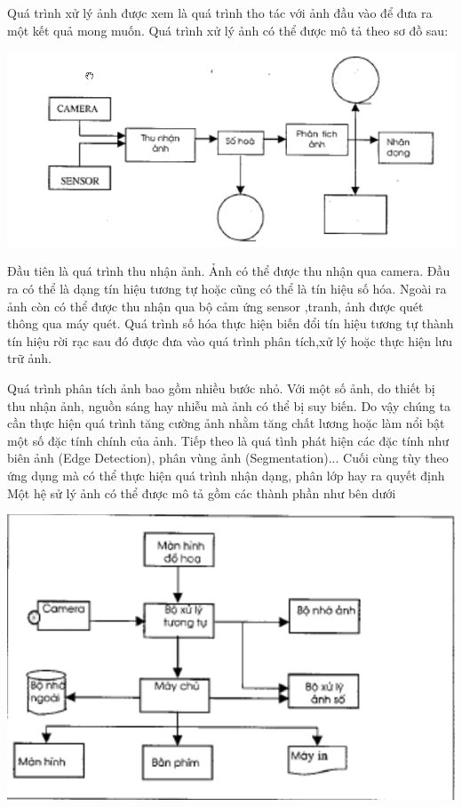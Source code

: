 \documentclass[12pt,oneside,a4]{report}
\begin{document}
Quá trình xử lý ảnh được xem là quá trình tho tác với ảnh đầu vào để đưa ra một kết quả mong muốn. Quá trình xử lý ảnh có thể được mô tả theo sơ đồ sau:
\begin{center}
\includegraphics[]{figure/htxulyanh.png}
\end{center}
Đầu tiên là quá trình thu nhận ảnh. Ảnh có thể được thu nhận qua camera. Đầu ra có thể là dạng tín hiệu tương tự hoặc cũng có thể là tín hiệu số hóa. Ngoài ra ảnh còn có thể được thu nhận qua bộ cảm ứng sensor ,tranh, ảnh được quét thông qua máy quét.
Quá trình số hóa thực hiện biến đổi tín hiệu tương tự thành tín hiệu rời rạc sau đó được đưa vào quá trình phân tích,xử lý hoặc thực hiện lưu trữ ảnh.

Quá trình phân tích ảnh bao gồm nhiều bước nhỏ. Với một số ảnh, do thiết bị thu nhận ảnh, nguồn sáng hay nhiễu mà ảnh có thể bị suy biến. Do vậy chúng ta cần thực hiện quá trình tăng cường ảnh nhằm tăng chất lương hoặc làm nổi bật một số đặc tính chính của ảnh. Tiếp theo là quá tình phát hiện các đặc tính như biên ảnh (Edge Detection), phân vùng ảnh (Segmentation)...
Cuối cùng tùy theo ứng dụng mà có thể thực hiện quá trình nhận dạng, phân lớp hay ra quyết định 
Một hệ sử lý ảnh có thể được mô tả gồm các thành phần như bên dưới
\begin{center}
\includegraphics[]{figure/tpxulyanh.png}
\end{center}
\end{document}
